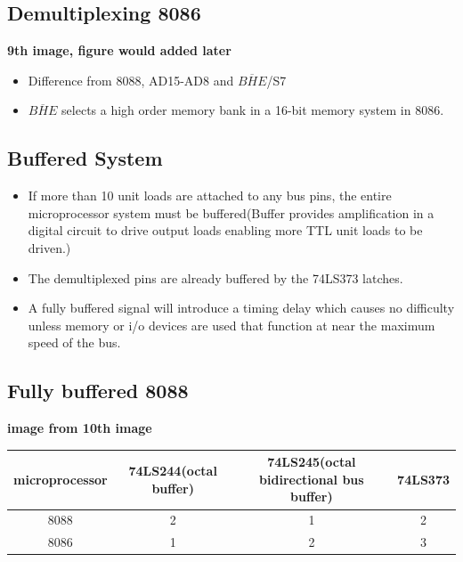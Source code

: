 \documentclass[12pt]{article}
\begin{document}
\subsection{Demultiplexing 8086}
\textbf{9th image, figure would added later}\\
\begin{itemize}
	\item Difference from 8088, AD15-AD8 and $\overline{BHE}$/S7
	\item $\overline{BHE}$ selects a high order memory bank in a 16-bit memory system in 8086.
\end{itemize}

\subsection{Buffered System}
\begin{itemize}
	\item If more than 10 unit loads are attached to any bus pins, the entire microprocessor system must be buffered(Buffer provides amplification in a digital circuit to drive output loads enabling more TTL unit loads to be driven.)
	
	\item The demultiplexed pins are already buffered by the 74LS373 latches.
	
	\item A fully buffered signal will introduce a timing delay which causes no difficulty unless memory or i/o devices are used that function at near the maximum speed of the bus.
\end{itemize}

\subsection{Fully buffered 8088}
\textbf{image from 10th image}

\begin{table}[H]
	\centering
	\begin{tabular}{|c|c|c|c|}
		\hline
		microprocessor & 74LS244(octal buffer) & 74LS245(octal bidirectional bus buffer) & 74LS373\\\hline
		8088 & 2 & 1 & 2\\\hline
		8086 & 1 & 2 & 3\\\hline
	\end{tabular}
\end{table}
\end{document}
